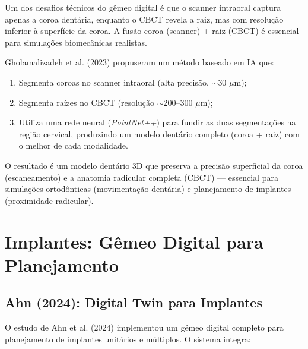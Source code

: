 Um dos desafios técnicos do gêmeo digital é que o scanner intraoral captura apenas a coroa dentária, enquanto o CBCT revela a raiz, mas com resolução inferior à superfície da coroa. A fusão coroa (scanner) + raiz (CBCT) é essencial para simulações biomecânicas realistas.

Gholamalizadeh et al. (2023) propuseram um método baseado em IA que:
\begin{enumerate}
    \item Segmenta coroas no scanner intraoral (alta precisão, $\sim$30 $\mu$m);
    \item Segmenta raízes no CBCT (resolução $\sim$200--300 $\mu$m);
    \item Utiliza uma rede neural (\textit{PointNet++}) para fundir as duas segmentações na região cervical, produzindo um modelo dentário completo (coroa + raiz) com o melhor de cada modalidade.
\end{enumerate}

O resultado é um modelo dentário 3D que preserva a precisão superficial da coroa (escaneamento) e a anatomia radicular completa (CBCT) --- essencial para simulações ortodônticas (movimentação dentária) e planejamento de implantes (proximidade radicular).

\section{Implantes: Gêmeo Digital para Planejamento}

\subsection{Ahn (2024): Digital Twin para Implantes}

O estudo de Ahn et al. (2024) implementou um gêmeo digital completo para planejamento de implantes unitários e múltiplos. O sistema integra:


